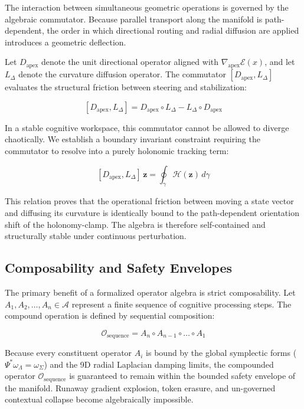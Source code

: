 The interaction between simultaneous geometric operations is governed by the algebraic commutator. Because parallel transport along the manifold is path-dependent, the order in which directional routing and radial diffusion are applied introduces a geometric deflection.

Let $D_{\mathrm{apex}}$ denote the unit directional operator aligned with $\nabla_{\mathrm{apex}} \mathcal{E}(x)$, and let $L_{\Delta}$ denote the curvature diffusion operator. The commutator $[D_{\mathrm{apex}}, L_{\Delta}]$ evaluates the structural friction between steering and stabilization:

\[
[D_{\mathrm{apex}}, L_{\Delta}] = D_{\mathrm{apex}} \circ L_{\Delta} - L_{\Delta} \circ D_{\mathrm{apex}}
\]

In a stable cognitive workspace, this commutator cannot be allowed to diverge chaotically. We establish a boundary invariant constraint requiring the commutator to resolve into a purely holonomic tracking term:

\[
[D_{\mathrm{apex}}, L_{\Delta}]\,\mathbf{z} = \oint_{\gamma} \mathcal{H}(\mathbf{z}) \, d\gamma
\]

This relation proves that the operational friction between moving a state vector and diffusing its curvature is identically bound to the path-dependent orientation shift of the holonomy-clamp. The algebra is therefore self-contained and structurally stable under continuous perturbation.

\subsection{Composability and Safety Envelopes}

The primary benefit of a formalized operator algebra is strict composability. Let $A_1, A_2, \dots, A_n \in \mathcal{A}$ represent a finite sequence of cognitive processing steps. The compound operation is defined by sequential composition:

\[
\mathcal{O}_{\mathrm{sequence}} = A_n \circ A_{n-1} \circ \dots \circ A_1
\]

Because every constituent operator $A_i$ is bound by the global symplectic forms ($\Psi^* \omega_{\Lambda} = \omega_{\Sigma}$) and the 9D radial Laplacian damping limits, the compounded operator $\mathcal{O}_{\mathrm{sequence}}$ is guaranteed to remain within the bounded safety envelope of the manifold. Runaway gradient explosion, token erasure, and un-governed contextual collapse become algebraically impossible.
